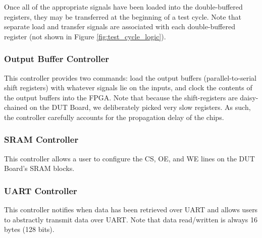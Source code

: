 Once all of the appropriate signals have been loaded into the double-buffered registers, they may be transferred at the beginning of a test cycle. Note that separate load and transfer signals are associated with each double-buffered register (not shown in Figure \ref{fig:test_cycle_logic}). 

\subsubsection{Output Buffer Controller}
This controller provides two commands: load the output buffers (parallel-to-serial shift registers) with whatever signals lie on the inputs, and clock the contents of the output buffers into the FPGA. Note that because the shift-registers are daisy-chained on the DUT Board, we deliberately picked very slow registers. As such, the controller carefully accounts for the propagation delay of the chips.

\subsubsection{SRAM Controller}
This controller allows a user to configure the CS, OE, and WE lines on the DUT Board's SRAM blocks.

\subsubsection{UART Controller}
This controller notifies when data has been retrieved over UART and allows users to abstractly transmit data over UART. Note that data read/written is always 16 bytes (128 bits).

